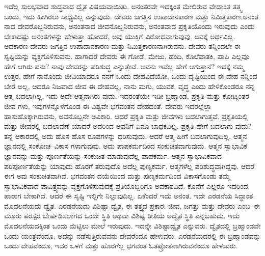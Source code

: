ಇದೆಲ್ಲ ಸುಲಭವಾದ ಶುದ್ಧವಾದ ದ್ವೈತ ವಿಷಯವಾಯಿತು. ಅನಂತರವೇ ಇದಕ್ಕಿಂತ ಮೇಲಿರುವ ವೇದಾಂತ ತತ್ತ್ವ ಬಂದು, ಇದು ಹೀಗಿರಲು ಸಾಧ್ಯವಿಲ್ಲ ಎನ್ನುವುದು. ದೇವರು ಜಗತ್ತಿನ ಉಪಾದಾನಕಾರಣ ಮತ್ತು ನಿಮಿತ್ತಕಾರಣ.ಅನಂತ ನಾದ ದೇವರೊಬ್ಬನಿರುವನು, ಅನಂತನಾದ ಜೀವನೊಬ್ಬನಿರುವನು, ಅನಂತವಾದ ಪ್ರಕೃತಿಯೊಂದು ಇರುವುದು ಎಂದು ಬೇಕಾದಷ್ಟು ಅನಂತಗಳನ್ನು ಹೇಳುತ್ತಾ ಹೋದರೆ, ಅವು ಯುಕ್ತಿಗೆ ವಿರೋಧವಾಗುವುವು. ಅವಕ್ಕೆ ಅರ್ಥವಿಲ್ಲ. ಆದಕಾರಣ ದೇವರು ಜಗತ್ತಿನ ಉಪಾದಾನಕಾರಣ ಮತ್ತು ನಿಮಿತ್ತಕಾರಣನಾಗಿರುವನು. ದೇವರು ತನ್ನಿಂದಲೇ ಈ ಸೃಷ್ಟಿಯನ್ನು ವ್ಯಕ್ತಗೊಳಿಸುವನು. ಹಾಗಾದರೆ ದೇವರು ಈ ಗೋಡೆ, ಮೇಜು, ಹಂದಿ, ಕೊಲೆಪಾತಕಿ, ಪಾಪಿ ಎಲ್ಲವೂ ಹೇಗೆ ಆಗಿರು ವನು? ನಾವು ದೇವರನ್ನು ಪರಿಶುದ್ಧ ಎನ್ನುತ್ತೇವೆ. ಅವನು ಇವೆಲ್ಲ ಹೇಗೆ ಆಗುತ್ತಾನೆ? ಇದಕ್ಕೆ ನಮ್ಮ ಉತ್ತರ, ಹೇಗೆ ನಾನೊಂದು ಜೀವಿಯಾದರೂ ನನಗೆ ಒಂದು ದೇಹವಿದೆಯೋ, ಒಂದು ದೃಷ್ಟಿಯಿಂದ ಈ ದೇಹ ನನ್ನಿಂದ ಬೇರೆ ಅಲ್ಲ, ಆದರೂ ನಿಜವಾದ ಜೀವ ಈ ದೇಹವಲ್ಲ. ನಾನು ಮಗು, ಯುವಕ, ವೃದ್ಧ ಎಂದು ಹೇಳಿಕೊಂಡರೂ ನನ್ನ ಆತ್ಮ ಬದಲಾಗಿಲ್ಲ. ಇದು ಅದೇ ಆತ್ಮನಾಗಿರು ವುದು. ಇದರಂತೆಯೇ ಇಡೀ ಬ್ರಹ್ಮಾಂಡ, ಪ್ರಕೃತಿ ಮತ್ತು ಕೋಟ್ಯಂತರ ಜೀವ ಗಳು, ಇವುಗಳನ್ನೊಳಗೊಂಡ ಈ ವಿಶ್ವವೇ ಭಗವಂತನ ದೇಹದಂತೆ. ದೇವರು ಇದರಲ್ಲೆಲ್ಲಾ ಹಾಸುಹೊಕ್ಕಾಗಿರುವನು, ಅವನೊಬ್ಬನೇ ಅವಿಕಾರಿ. ಆದರೆ ಪ್ರಕೃತಿ ಮತ್ತು ಜೀವಗಳು ಬದಲಾಗುತ್ತವೆ. ಪ್ರಕೃತಿಯಲ್ಲಿ ಮತ್ತು ಜೀವರಲ್ಲಿ ಬದಲಾವಣೆ ಯಾದರೆ ಅದರಿಂದ ಅವನಿಗೆ ಏನೂ ಬಾಧಕವಿಲ್ಲ. ಪ್ರಕೃತಿ ಹೇಗೆ ಬದಲಾಗು ವುದು? ತನ್ನ ಆಕಾರದಲ್ಲಿ ಅದು ಹೊಸ ಹೊಸ ರೂಪಗಳನ್ನು ಧರಿಸುವುದು. ಆದರೆ ಆತ್ಮ ಹೀಗೆ ಬದಲಾಗುವುದಿಲ್ಲ. ಆತ್ಮನ ಜ್ಞಾನದಲ್ಲಿ ಸಂಕೋಚ–ವಿಕಾಸ ಗಳಾಗುವುವು. ಅದು ಪಾಪಕರ್ಮದಿಂದ ಸಂಕುಚಿತವಾಗುವುದು. ಆತ್ಮನ ಸ್ವಾಭಾವಿಕ ಜ್ಞಾನವನ್ನು ಮತ್ತು ಪೂರ್ಣತೆಯನ್ನು ಸಂಕುಚಿತ ಮಾಡುವುದೆಲ್ಲ ಪಾಪಕರ್ಮ. ಆತ್ಮನ ಸ್ವಾಭಾವಿಕವಾದ ಪರಿಪೂರ್ಣತೆಯನ್ನು ಯಾವುದು ಹೊರಗೆ ತರುವುದೊ ಅದೆಲ್ಲ ಪುಣ್ಯಕರ್ಮ. ಆತ್ಮಗಳೆಲ್ಲ ಪರಿಶುದ್ಧವಾಗಿದ್ದವು. ಆದರೆ ಈಗ ಅವು ಸಂಕುಚಿತವಾಗಿವೆ. ಭಗವಂತನ ದಯೆಯಿಂದ ಮತ್ತು ಪುಣ್ಯಕರ್ಮದಿಂದ ವಿಕಾಸಗೊಂಡು ತಮ್ಮ ಸ್ವಾಭಾವಿಕವಾದ ಪಾವಿತ್ರ್ಯವನ್ನು ವ್ಯಕ್ತಗೊಳಿಸುವುದಕ್ಕೆ ಪ್ರತಿಯೊಬ್ಬರಿಗೂ ಅವಕಾಶವಿದೆ. ಕೊನೆಗೆ ಎಲ್ಲರೂ ಇದರಿಂದ ಪಾರಾಗ ಬೇಕಾಗಿದೆ. ಆದರೆ ಈ ಸೃಷ್ಟಿ ಇಲ್ಲಿಗೇ ನಿಲ್ಲುವುದಿಲ್ಲ. ಏಕೆಂದರೆ ಇದು ಅನಂತ. ಇದೇ ಎರಡನೆಯ ಸಿದ್ಧಾಂತ. ಮೊದಲನೆಯದು ದ್ವೈತ. ಎರಡನೆಯದು ವಿಶಿಷ್ಟಾ ದ್ವೈತ, ಈ ತತ್ತ್ವದ ಪ್ರಕಾರ: ಜೀವ, ಜಗತ್ತು ಮತ್ತು ದೇವರು ಎಂಬ–ಈ ಮೂರು ಪರಸ್ಪರ ಬೇರ್ಪಡಿಸಲಾಗದ ಒಂದೇ ಸ್ಥಿತಿ ಅಥವಾ ವಿಶಿಷ್ಟ ರೀತಿಯ ಅದ್ವೈತ ಸ್ಥಿತಿ ಎನ್ನಬಹುದು. ಇದು ಮೊದಲನೆಯದಕ್ಕಿಂತ ಒಂದು ಮೆಟ್ಟಿಲು ಮೇಲೆ ಇರುವುದು. ಇದನ್ನೇ ವಿಶಿಷ್ಟಾದ್ವೈತ ಎನ್ನುವರು. ದ್ವೈತದಲ್ಲಿ ಬ್ರಹ್ಮಾಂಡವೇ ಒಂದು ಯಂತ್ರವೆಂದೂ, ಅದನ್ನು ನಡೆಸುತ್ತಿರುವವನು ದೇವರೆಂದೂ ಹೇಳುವರು. ಎರಡನೆಯದರಲ್ಲಿ ಈ ಬ್ರಹ್ಮಾಂಡವನ್ನು ಒಂದು ದೇಹವೆಂದೂ, ಇದರ ಒಳಗೆ ಮತ್ತು ಹೊರಗೆಲ್ಲ ಭಗವಂತ ಓತಪ್ರೋತನಾಗಿರುವನೆಂದೂ ಹೇಳುವರು.

